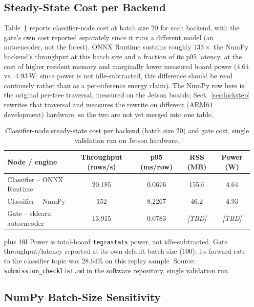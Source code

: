 \documentclass[runningheads]{llncs}
\newcommand{\ph}[1]{{\color{gray}\textit{[#1]}}}
\newcommand{\tabnote}[1]{%
  \vspace{4pt}\par\noindent
  \begin{minipage}{\textwidth}%
    \footnotesize\parindent=0pt\leftskip=0pt\rightskip=0pt\parfillskip=0pt plus 1fil\relax
    #1%
  \end{minipage}}
\begin{document}
\subsection{Steady-State Cost per Backend}

Table~\ref{tab:engines} reports classifier-node cost at batch size 20 for each backend, with the gate's own cost reported separately since it runs a different model (an autoencoder, not the forest). ONNX Runtime sustains roughly $133\times$ the NumPy backend's throughput at this batch size and a fraction of its p95 latency, at the cost of higher resident memory and marginally lower measured board power (4.64 vs.\ 4.93\,W; since power is not idle-subtracted, this difference should be read cautiously rather than as a per-inference energy claim). The NumPy row here is the original per-tree traversal, measured on the Jetson boards; Sect.~\ref{sec:lockstep} rewrites that traversal and measures the rewrite on different (ARM64 development) hardware, so the two are not yet merged into one table.

\begin{table}[htbp]
  \caption{Classifier-node steady-state cost per backend (batch size 20) and gate cost, single validation run on Jetson hardware.}
  \label{tab:engines}
  \centering
  \small
  \begin{tabular}{l c c c c}
    \toprule
    Node / engine & Throughput (rows/s) & p95 (ms/row) & RSS (MB) & Power (W) \\
    \midrule
    Classifier -- ONNX Runtime & 20{,}185 & 0.0676 & 155.6 & 4.64 \\
    Classifier -- NumPy        & 152     & 8.2267 & 46.2  & 4.93 \\
    Gate -- sklearn autoencoder & 13{,}915 & 0.0783 & \ph{TBD} & \ph{TBD} \\
    \bottomrule
  \end{tabular}
  \tabnote{Power is total-board \texttt{tegrastats} power, not idle-subtracted. Gate throughput/latency reported at its own default batch size (100); its forward rate to the classifier topic was 28.64\% on this replay sample. Source: \texttt{submission\_checklist.md} in the software repository, single validation run.}
\end{table}

\subsection{NumPy Batch-Size Sensitivity}
\label{sec:batch-sensitivity}
\end{document}
